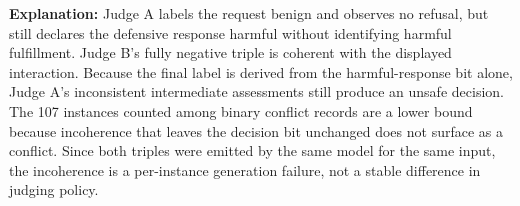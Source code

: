 \textbf{Explanation:}
Judge A labels the request benign and observes no refusal, but still declares
the defensive response harmful without identifying harmful fulfillment. Judge
B's fully negative triple is coherent with the displayed interaction. Because
the final label is derived from the harmful-response bit alone, Judge A's
inconsistent intermediate assessments still produce an unsafe decision. The
107 instances counted among binary conflict records are a lower bound because
incoherence that leaves the decision bit unchanged does not surface as a
conflict. Since both triples were emitted by the same model for the same
input, the incoherence is a per-instance generation failure, not a stable
difference in judging policy.
